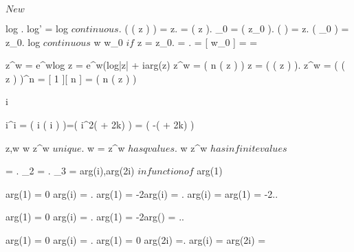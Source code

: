 \documentclass[../Main/main]{subfiles}
\begin{document}
\unit{ $ New $ }
{

	{
		{
			\function{ log }{ \C \setminus e^{i\alpha}(-\infty,0] }{ B_\alpha }
		}
		\holds
		{
			log \in \Hc.
			log' = 
		}
		\demonstration
		{
			log $ continuous $.
			\exp( \log( z ) ) = z.
			\omega = \log( z ).
			\omega_0 = \log( z_0 ).
			\exp( \omega ) = z.
			\exp( \omega_0 ) = z_0.
			log $ continuous $ \imp w \convergesto w_0 $ if $ z = z_0.
			 = .
			 = [ w_0 ] =  = 
		}
	}
	
	
	{
		{
			z^w = e^{wlog z} = e^{w(log|z| + iarg(z)}
		}
		\holds
		{
			z^w = \exp( n \log( z ) )
		}
		\demonstration
		{
			z = \exp( \log( z ) ).
			z^w = \exp( \log( z ) )^n = [ 1 ][ n ] = \exp( n \log( z ) )
		}
	}
	
	
	{
		{
			i \in \C
		}
		{
			{
				i^i = \exp( i \log( i ) )=\exp( i^2( + 2k\pi) ) = \exp( -( + 2k\pi) )
			}
			
		}
	}
	
	
	{
		{
			z,w \in \C
		}
		\holds
		{
			w \in \Z \imp z^w $ unique $.
			w =  \in \Q \imp z^w $ has q values $.
			w \in \R \setminus \Q \imp z^w $ has infinite values $ 
		}
	}
	
	
	{
		{
			\Omega = \C \setminus {}.
			\Omega_2 = \C \setminus {}.
			\Omega_3 = \C \setminus {} \cup {} \cup {}
		}
		\study
		{
			arg(i),arg(2i) $ in function of $ arg(1)
		}	
		\start
		{
			arg(1) = 0 \imp arg(i) = .
			arg(1) = -2\pi \imp arg(i) = .
			arg(i) =  \imp arg(1) = -2\pi..

			
			arg(1) = 0 \imp arg(i) = .
			arg(1) = -2\pi \imp arg(\pi) = \frac{ -7\pi }{ 2 }..

			arg(1) = 0 \imp arg(i) = \frac{ \pi }{ 2 }.
			arg(1) = 0 \imp arg(2i) =\frac{ -3\pi }{ 2 }.
			arg(i) =  \imp arg(2i) = 
		}
	}
	
}
\end{document}
